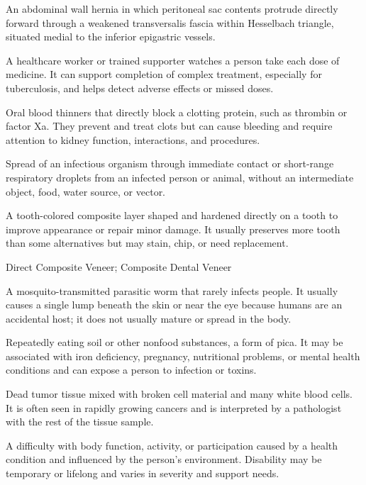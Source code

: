  An abdominal wall hernia in which peritoneal sac contents protrude directly forward through a weakened transversalis fascia within Hesselbach triangle, situated medial to the inferior epigastric vessels.

 A healthcare worker or trained supporter watches a person take each dose of medicine. It can support completion of complex treatment, especially for tuberculosis, and helps detect adverse effects or missed doses.

 Oral blood thinners that directly block a clotting protein, such as thrombin or factor Xa. They prevent and treat clots but can cause bleeding and require attention to kidney function, interactions, and procedures.

 Spread of an infectious organism through immediate contact or short-range respiratory droplets from an infected person or animal, without an intermediate object, food, water source, or vector.

 A tooth-colored composite layer shaped and hardened directly on a tooth to improve appearance or repair minor damage. It usually preserves more tooth than some alternatives but may stain, chip, or need replacement.

\synonyms
Direct Composite Veneer; Composite Dental Veneer

 A mosquito-transmitted parasitic worm that rarely infects people. It usually causes a single lump beneath the skin or near the eye because humans are an accidental host; it does not usually mature or spread in the body.

 Repeatedly eating soil or other nonfood substances, a form of pica. It may be associated with iron deficiency, pregnancy, nutritional problems, or mental health conditions and can expose a person to infection or toxins.

 Dead tumor tissue mixed with broken cell material and many white blood cells. It is often seen in rapidly growing cancers and is interpreted by a pathologist with the rest of the tissue sample.

 A difficulty with body function, activity, or participation caused by a health condition and influenced by the person’s environment. Disability may be temporary or lifelong and varies in severity and support needs.

